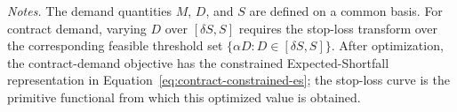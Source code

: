 \documentclass[Times1COL]{WileyNJDv5}
\providecommand{\tablebodyfont}{\small}
\providecommand{\tablefootnotefont}{\small}
\begin{document}
\renewcommand{\bibfont}{\normalfont\fontsize{12}{16}\selectfont}



\clearpage
\begingroup
\centering
\centering
{}
\label{tab:tariff-functionals}
{\tablebodyfont
\setlength{\tabcolsep}{5pt}
\renewcommand{\arraystretch}{1.18}
}
\par\smallskip
{\tablefootnotefont\textit{Notes.} The demand quantities $M$, $D$, and $S$ are defined on a common basis. For contract demand, varying $D$ over $[\delta S,S]$ requires the stop-loss transform over the corresponding feasible threshold set $\{\alpha D:D\in[\delta S,S]\}$. After optimization, the contract-demand objective has the constrained Expected-Shortfall representation in Equation~\eqref{eq:contract-constrained-es}; the stop-loss curve is the primitive functional from which this optimized value is obtained.}
\endgroup
\end{document}
